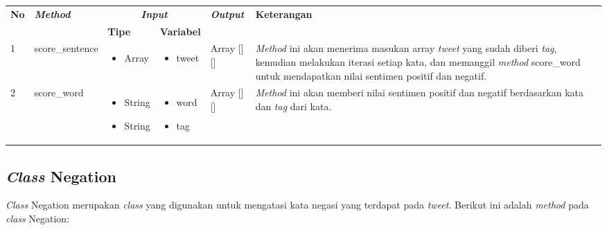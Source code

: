 \begin{table}[H]
	\centering
	\small
	\begin{adjustbox}{width=1\textwidth}	
	\begin{tabular}{|p{0.4cm}|p{3.2cm}|p{1.4cm}|p{1.7cm}|p{1.20cm}|p{3.35cm}|}
		\hline
		\multirow{2}{*}{\textbf{No}} & \multirow{2}{*}{\textit{\textbf{Method}}} & \multicolumn{2}{c|}{\textit{\textbf{Input}}} & \multirow{2}{*}{\textit{\textbf{Output}}} & 
		\multirow{2}{*}{\textbf{Keterangan}}\\
		\cline{3-4}
		& & \textbf{Tipe} & \textbf{Variabel} & & \\
		\hline
		1 & score\_sentence & \begin{itemize}[leftmargin=*,label={-}]
			\item Array\end{itemize}
		& \begin{itemize}[leftmargin=*,label={-}]
			\item tweet\end{itemize}
		& Array [][] & \textit{Method} ini akan menerima masukan array \textit{tweet} yang sudah diberi \textit{tag}, kemudian melakukan iterasi setiap kata, dan memanggil \textit{method} score\_word untuk mendapatkan nilai sentimen positif dan negatif. \\
		\hline
		2 & score\_word & \begin{itemize}[leftmargin=*,label={-}]
			\item String\item String\end{itemize}
		& \begin{itemize}[leftmargin=*,label={-}]
			\item word\item tag\end{itemize}
		& Array [][] & \textit{Method} ini akan memberi nilai sentimen positif dan negatif berdasarkan kata dan \textit{tag }dari kata. \\
		\hline
	\end{tabular}
	\end{adjustbox}
\end{table}
\subsection{\textit{Class} Negation}
\textit{Class }Negation merupakan \textit{class} yang digunakan untuk mengatasi kata negasi yang terdapat pada \textit{tweet}. Berikut ini adalah \textit{method }pada \textit{class }Negation:

